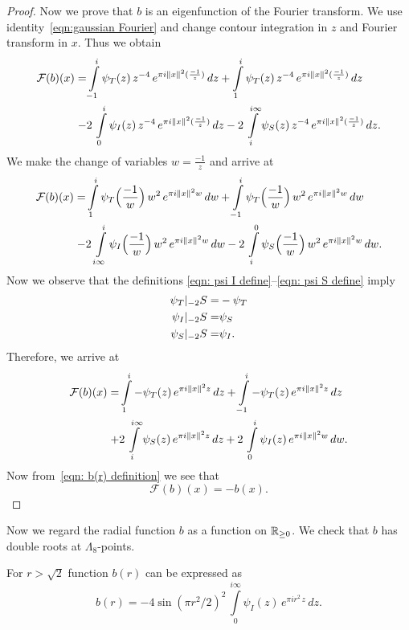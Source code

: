 \begin{proof}
Now we prove that $b$ is an eigenfunction of the Fourier transform. We use identity~\eqref{eqn:gaussian Fourier} and change contour integration in $z$ and Fourier transform in $x$. Thus we obtain
\begin{align}
  \mathcal{F}(b)(x)= & \int\limits_{-1}^{i}\psi_T(z)\,z^{-4}\,e^{\pi i \|x\|^2 (\frac{-1}{z})}\,dz
    + \int\limits_{1}^{i}\psi_T(z)\,z^{-4}\,e^{\pi i \|x\|^2 (\frac{-1}{z})}\,dz \notag \\
  -& 2\,\int\limits_{0}^{i}\psi_I(z)\,z^{-4}\,e^{\pi i \|x\|^2 (\frac{-1}{z})}\,dz
  - 2\,\int\limits_{i}^{i\infty}\psi_S(z)\,z^{-4}\,e^{\pi i \|x\|^2 (\frac{-1}{z})}\,dz. \notag
\end{align}
We make the change of variables $w=\frac{-1}{z}$ and arrive at
\begin{align}
  \mathcal{F}(b)(x)= & \int\limits_{1}^{i}\psi_T\Big(\frac{-1}{w}\Big)\,w^{2}\,e^{\pi i \|x\|^2 w}\,dw
    + \int\limits_{-1}^{i}\psi_T\Big(\frac{-1}{w}\Big)\,w^{2}\,e^{\pi i \|x\|^2 w}\,dw \notag \\
  -& 2\,\int\limits_{i\infty}^{i}\psi_I\Big(\frac{-1}{w}\Big)\,w^{2}\,e^{\pi i \|x\|^2 w}\,dw
  - 2\,\int\limits_{i}^{0}\psi_S\Big(\frac{-1}{w}\Big)\,w^{2}\,e^{\pi i \|x\|^2 w}\,dw.\notag
\end{align}
Now we observe that the definitions \eqref{eqn: psi I define}--\eqref{eqn: psi S define}   imply
\begin{align}\psi_T|_{-2}S=&-\psi_T \notag \\
\psi_I|_{-2}S=&\psi_S \notag \\
\psi_S|_{-2}S=&\psi_I. \notag
\end{align}
Therefore, we arrive at
\begin{align}
  \mathcal{F}(b)(x)= & \int\limits_{1}^{i}-\psi_T(z)\,e^{\pi i \|x\|^2 z}\,dz
    + \int\limits_{-1}^{i}-\psi_T(z)\,e^{\pi i \|x\|^2 z}\,dz \notag \\
  +& 2\,\int\limits_{i}^{i\infty}\psi_S(z)\,e^{\pi i \|x\|^2 z}\,dz
  + 2\,\int\limits_{0}^{i}\psi_I(z)\,e^{\pi i \|x\|^2 w}\,dw.\notag
\end{align}
Now from~\eqref{eqn: b(r) definition} we see that
$$ \mathcal{F}(b)(x)=-b(x). $$
\end{proof}
Now we regard the radial function  $b$ as a function on $\mathbb{R}_{\geq0}$. We check that $b$ has double roots at $\Lambda_8$-points.
\begin{proposition}\label{prop: b(r) double zeroes}
For $r>\sqrt{2}$ function $b(r)$ can be expressed as
\begin{equation}\label{eqn: b double zeroes}
  b(r)=-4\sin(\pi r^2/2)^2\,\int\limits_{0}^{i\infty}\psi_I(z)\,e^{\pi i r^2 \,z}\,dz.
\end{equation}
\end{proposition}

